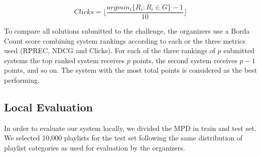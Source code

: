 \begin{displaymath}
  Clicks = \lfloor\frac{arg min_{i} \{R_{i}:R_{i} \in G\} - 1}{10}\rfloor
\end{displaymath}

To compare all solutions submitted to the challenge, the organizers use a Borda Count score combining system rankings according to each or the three metrics used (RPREC, NDCG and Clicks). For each of the three rankings of $p$ submitted systems the top ranked system receives $p$ points, the second system receives $p-1$ points, and so on. The system with the most total points is considered as the best performing.

\subsection{Local Evaluation}

In order to evaluate our system locally, we divided the MPD in train and test set. We selected 10,000 playlists for the test set following the same distribution of playlist categories as used for evaluation by the organizers.


